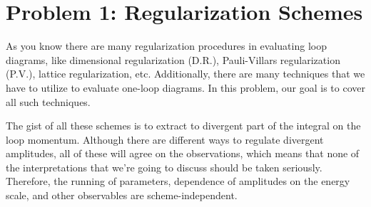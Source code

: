 \documentclass[11pt]{article}
\begin{document}
	
	
	\psetheader
	
	\section*{Problem 1: Regularization Schemes}
	
	\begin{problem}
		As you know there are many regularization procedures in evaluating loop diagrams, like dimensional regularization (D.R.), Pauli-Villars regularization (P.V.), lattice regularization, etc.
		Additionally, there are many techniques that we have to utilize to evaluate one-loop diagrams. In this problem, our goal is to cover all such techniques.
		
		The gist of all these schemes is to extract to divergent part of the integral on the loop momentum. Although there are different ways to regulate divergent amplitudes, all of these will agree on the observations, which means that none of the interpretations that we're going to discuss should be taken seriously. Therefore, the running of parameters, dependence of amplitudes on the energy scale, and other observables are scheme-independent.
		
	\end{problem}
\end{document}
